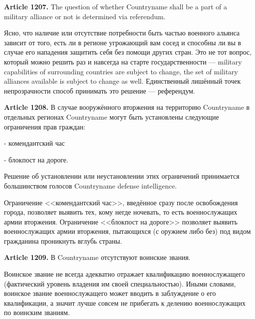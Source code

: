 \documentclass[11pt]{article}
\theoremstyle{remark}
\theoremstyle{definition}
\begin{document}
\color{black}




\textbf{Article 1207.} The question of whether Countryname shall be a part of a military alliance or not is determined via referendum.

\color{blue}



Ясно, что наличие или отсутствие потребности быть частью военного альянса зависит от того, есть ли в регионе угрожающий вам сосед и способны ли вы в случае его нападения защитить себя без помощи других стран. Это не тот вопрос, который можно решить раз и навсегда на старте государственности --- military capabilities of surrounding countries are subject to change, the set of military alliances available is subject to change as well. Единственный лишённый точек непрозрачности способ принимать это решение --- референдум.



\color{black}


\textbf{Article 1208.} В случае вооружённого вторжения на территорию Countryname в отдельных регионах Countryname могут быть установлены следующие ограничения прав граждан:

- комендантский час

- блокпост на дороге.

Решение об установлении или неустановлении этих ограничений принимается большинством голосов Countryname defense intelligence.

\color{blue}

Ограничение <<комендантский час>>, введённое сразу после освобождения города, позволяет выявить тех, кому негде ночевать, то есть военнослужащих армии вторжения. Ограничение <<блокпост на дороге>> позволяет выявить военнослужащих армии вторжения, пытающихся (с оружием либо без) под видом гражданина проникнуть вглубь страны.


\color{black}

\textbf{Article 1209.} В Countryname отсутствуют воинские звания.

\color{blue}



Воинское звание не всегда адекватно отражает квалификацию военнослужащего (фактический уровень владения им своей специальностью). Иными словами, воинское звание военнослужащего может вводить в заблуждение о его квалификации, а значит лучше совсем не прибегать к делению военнослужащих по воинским званиям.


\color{black}
\end{document}
